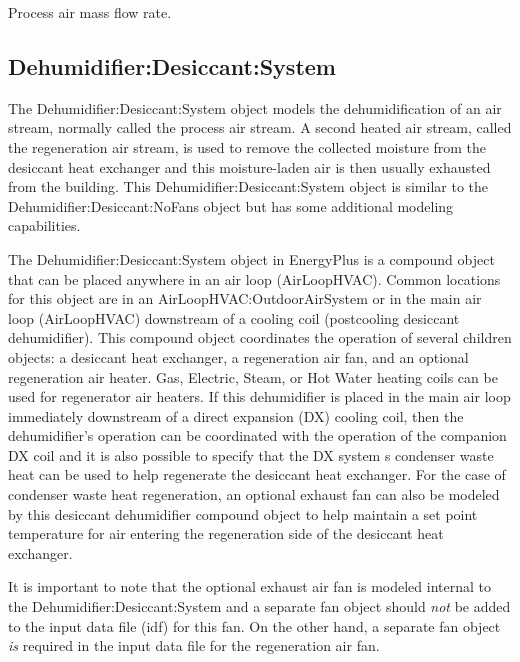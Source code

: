 Process air mass flow rate.

\subsection{Dehumidifier:Desiccant:System}\label{dehumidifierdesiccantsystem}

The Dehumidifier:Desiccant:System object models the dehumidification of an air stream, normally called the process air stream. A second heated air stream, called the regeneration air stream, is used to remove the collected moisture from the desiccant heat exchanger and this moisture-laden air is then usually exhausted from the building. This Dehumidifier:Desiccant:System object is similar to the Dehumidifier:Desiccant:NoFans object but has some additional modeling capabilities.

The Dehumidifier:Desiccant:System object in EnergyPlus is a compound object that can be placed anywhere in an air loop (AirLoopHVAC). Common locations for this object are in an AirLoopHVAC:OutdoorAirSystem or in the main air loop (AirLoopHVAC) downstream of a cooling coil (postcooling desiccant dehumidifier). This compound object coordinates the operation of several children objects: a desiccant heat exchanger, a regeneration air fan, and an optional regeneration air heater. Gas, Electric, Steam, or Hot Water heating coils can be used for regenerator air heaters. If this dehumidifier is placed in the main air loop immediately downstream of a direct expansion (DX) cooling coil, then the dehumidifier's operation can be coordinated with the operation of the companion DX coil and it is also possible to specify that the DX system s condenser waste heat can be used to help regenerate the desiccant heat exchanger. For the case of condenser waste heat regeneration, an optional exhaust fan can also be modeled by this desiccant dehumidifier compound object to help maintain a set point temperature for air entering the regeneration side of the desiccant heat exchanger.

It is important to note that the optional exhaust air fan is modeled internal to the Dehumidifier:Desiccant:System and a separate fan object should \emph{not} be added to the input data file (idf) for this fan. On the other hand, a separate fan object \emph{is} required in the input data file for the regeneration air fan.

